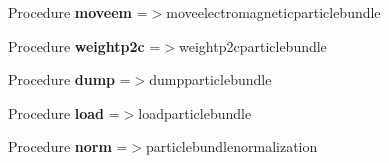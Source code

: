 \begin{DoxyCompactItemize}
Procedure {\bfseries moveem} =$>$moveelectromagneticparticlebundle
\item 
\mbox{\label{structmoduleparticlebundle_1_1particlebundle_a6810fb4ee51cedbe8f9bde35a68ebffe}} 
Procedure {\bfseries weightp2c} =$>$weightp2cparticlebundle
\item 
\mbox{\label{structmoduleparticlebundle_1_1particlebundle_a626a0c665d735a44263ddffc02b25019}} 
Procedure {\bfseries dump} =$>$dumpparticlebundle
\item 
\mbox{\label{structmoduleparticlebundle_1_1particlebundle_a8ccc326e9f26d75551375bcf73164d0a}} 
Procedure {\bfseries load} =$>$loadparticlebundle
\item 
\mbox{\label{structmoduleparticlebundle_1_1particlebundle_a3a7dd60e9200d742d50196828d35c3ce}} 
Procedure {\bfseries norm} =$>$particlebundlenormalization
\end{DoxyCompactItemize}
